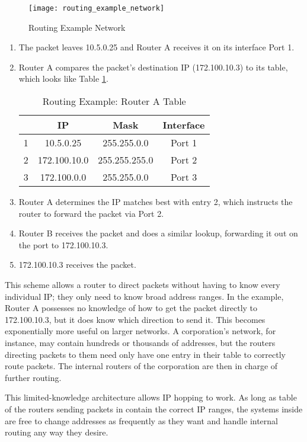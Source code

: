 \begin{figure}
\caption{Routing Example Network}
\label{fig:routing_example_network}
\centering
\texttt{[image: routing\_example\_network]}
\end{figure}

\begin{enumerate}[1.]
\item The packet leaves 10.5.0.25 and Router A receives it on its interface Port 1.
\item Router A compares the packet's destination \ac{IP} (172.100.10.3) to its table, which looks like Table \ref{tbl:routing_example_routera_table}.
	\begin{table}[h]
	\caption{Routing Example: Router A Table}
	\label{tbl:routing_example_routera_table}
	\centering
	\begin{tabular}{r|c|c|c}
	 & \textbf{\ac{IP}} & \textbf{Mask} & \textbf{Interface}\\
	\hline
	1 & 10.5.0.25 & 255.255.0.0 & Port 1\\
	2 & 172.100.10.0 & 255.255.255.0 & Port 2\\
	3 & 172.100.0.0 & 255.255.0.0 & Port 3\\
	\end{tabular}
	\end{table}
\item Router A determines the \ac{IP} matches best with entry 2, which instructs the router to forward the packet via Port 2.
\item Router B receives the packet and does a similar lookup, forwarding it out on the port to 172.100.10.3.
\item 172.100.10.3 receives the packet.
\end{enumerate}

\par This scheme allows a router to direct packets without having to know every individual IP; they only need to know broad address ranges. In the example, Router A possesses no knowledge of how to get the packet directly to 172.100.10.3, but it does know which direction to send it. This becomes exponentially more useful on larger networks. A corporation's network, for instance, may contain hundreds or thousands of addresses, but the routers directing packets to them need only have one entry in their table to correctly route packets. The internal routers of the corporation are then in charge of further routing.

\par This limited-knowledge architecture allows IP hopping to work. As long as table of the routers sending packets in contain the correct \ac{IP} ranges, the systems inside are free to change addresses as frequently as they want and handle internal routing any way they desire.

